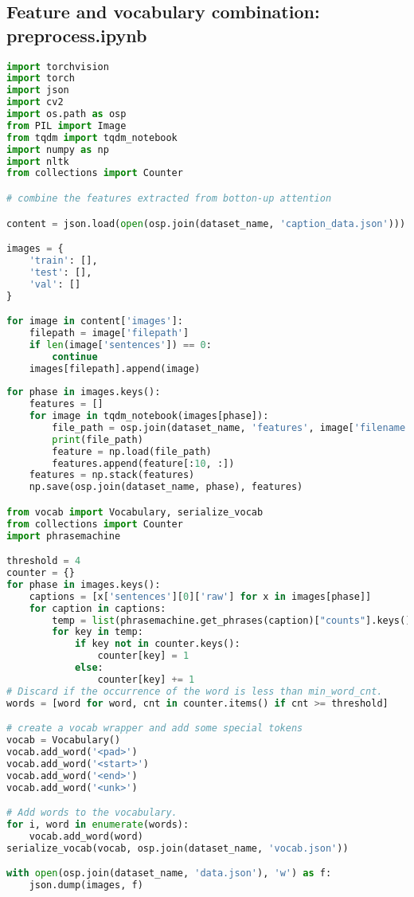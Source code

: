 \subsection{Feature and vocabulary combination: preprocess.ipynb}
\begin{lstlisting}[language=Python]
import torchvision
import torch
import json
import cv2
import os.path as osp
from PIL import Image
from tqdm import tqdm_notebook
import numpy as np
import nltk
from collections import Counter

# combine the features extracted from botton-up attention

content = json.load(open(osp.join(dataset_name, 'caption_data.json')))

images = {
    'train': [],
    'test': [],
    'val': []
}

for image in content['images']:
    filepath = image['filepath']
    if len(image['sentences']) == 0:
        continue
    images[filepath].append(image)
    
for phase in images.keys():
    features = []
    for image in tqdm_notebook(images[phase]):
        file_path = osp.join(dataset_name, 'features', image['filename'].split('.')[0] + '.npy')
        print(file_path)
        feature = np.load(file_path)
        features.append(feature[:10, :])
    features = np.stack(features)
    np.save(osp.join(dataset_name, phase), features)

from vocab import Vocabulary, serialize_vocab
from collections import Counter
import phrasemachine

threshold = 4
counter = {}
for phase in images.keys():
    captions = [x['sentences'][0]['raw'] for x in images[phase]]
    for caption in captions:
        temp = list(phrasemachine.get_phrases(caption)["counts"].keys())
        for key in temp:
            if key not in counter.keys():
                counter[key] = 1
            else:
                counter[key] += 1
# Discard if the occurrence of the word is less than min_word_cnt.
words = [word for word, cnt in counter.items() if cnt >= threshold]

# create a vocab wrapper and add some special tokens
vocab = Vocabulary()
vocab.add_word('<pad>')
vocab.add_word('<start>')
vocab.add_word('<end>')
vocab.add_word('<unk>')

# Add words to the vocabulary.
for i, word in enumerate(words):
    vocab.add_word(word)
serialize_vocab(vocab, osp.join(dataset_name, 'vocab.json'))

with open(osp.join(dataset_name, 'data.json'), 'w') as f:
    json.dump(images, f)
\end{lstlisting}
